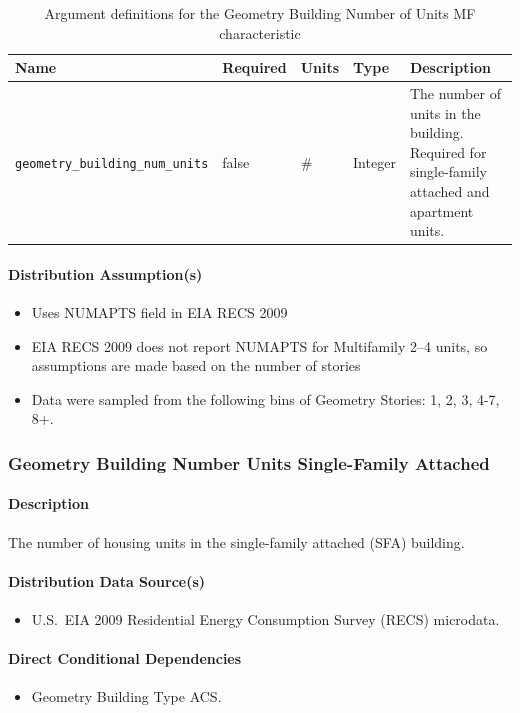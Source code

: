 \begin{longtable}[]{ |p{}|p{1.5cm}|p{1cm}|p{1.1cm}|p{6cm}| }
\caption{Argument definitions for the Geometry Building Number of Units MF characteristic} \label{table:hc_arg_def_geom_build_units_mf}  \\
\toprule\noalign{}
Name & Required & Units & Type & Description \\
\midrule\noalign{}
\endhead
\bottomrule\noalign{}
\endlastfoot
\texttt{geometry\_building\_num\_units} & false & \# & Integer & The
number of units in the building. Required for single-family attached and
apartment units. \\
\end{longtable}

\paragraph{Distribution Assumption(s)}
\begin{itemize}
    \item Uses NUMAPTS field in EIA RECS 2009
    \item EIA RECS 2009 does not report NUMAPTS for Multifamily 2--4 units, so assumptions are made based on the number of stories
    \item Data were sampled from the following bins of Geometry Stories: 1, 2, 3, 4-7, 8+.
\end{itemize}

\subsubsection{Geometry Building Number Units Single-Family Attached}

\paragraph{Description}
The number of housing units in the single-family attached (SFA) building.

\paragraph{Distribution Data Source(s)}
\begin{itemize}
    \item U.S.~EIA 2009 Residential Energy Consumption Survey (RECS) microdata.
\end{itemize}

\paragraph{Direct Conditional Dependencies}
\begin{itemize}
    \item Geometry Building Type ACS.
\end{itemize}

